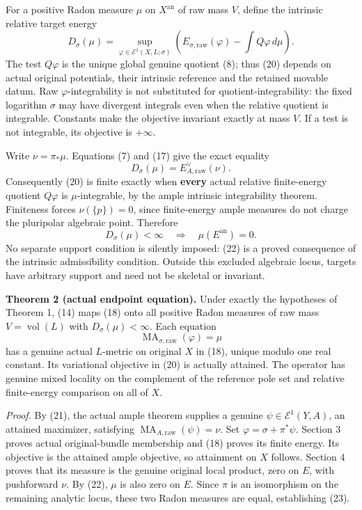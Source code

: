 \documentclass[
  10pt,
]{article}
\begin{document}
For a positive Radon measure \(\mu\) on \(X^{\mathrm{an}}\) of raw mass
\(V\), define the intrinsic relative target energy \[
 D_\sigma(\mu)=
 \sup_{\varphi\in\mathcal E^1(X,L;\sigma)}
       \left(E_{\sigma,\mathrm{raw}}(\varphi)-\int Q\varphi\,d\mu\right).
 \tag{20}
\] The test \(Q\varphi\) is the unique global genuine quotient (8); thus
(20) depends on actual original potentials, their intrinsic reference
and the retained movable datum. Raw \(\varphi\)-integrability is not
substituted for quotient-integrability: the fixed logarithm \(\sigma\)
may have divergent integrals even when the relative quotient is
integrable. Constants make the objective invariant exactly at mass
\(V\). If a test is not integrable, its objective is \(+\infty\).

Write \(\nu=\pi_*\mu\). Equations (7) and (17) give the exact equality
\[ D_\sigma(\mu)=E_{A,\mathrm{raw}}^\vee(\nu). \tag{21} \] Consequently
(20) is finite exactly when \textbf{every} actual relative finite-energy
quotient \(Q\varphi\) is \(\mu\)-integrable, by the ample intrinsic
integrability theorem. Finiteness forces \(\nu(\{p\})=0\), since
finite-energy ample measures do not charge the pluripolar algebraic
point. Therefore
\[ D_\sigma(\mu)<\infty\quad\Longrightarrow\quad\mu(E^{\mathrm{an}})=0. \tag{22} \]
No separate support condition is silently imposed: (22) is a proved
consequence of the intrinsic admissibility condition. Outside this
excluded algebraic locus, targets have arbitrary support and need not be
skeletal or invariant.

\textbf{Theorem 2 (actual endpoint equation).} Under exactly the
hypotheses of Theorem 1, (14) maps (18) onto all positive Radon measures
of raw mass \(V=\operatorname{vol}(L)\) with \(D_\sigma(\mu)<\infty\).
Each equation
\[ \operatorname{MA}_{\sigma,\mathrm{raw}}(\varphi)=\mu \tag{23} \] has
a genuine actual \(L\)-metric on original \(X\) in (18), unique modulo
one real constant. Its variational objective in (20) is actually
attained. The operator has genuine mixed locality on the complement of
the reference pole set and relative finite-energy comparison on all of
\(X\).

\emph{Proof.} By (21), the actual ample theorem supplies a genuine
\(\psi\in\mathcal E^1(Y,A)\), an attained maximizer, satisfying
\(\operatorname{MA}_{A,\mathrm{raw}}(\psi)=\nu\). Set
\(\varphi=\sigma+\pi^*\psi\). Section 3 proves actual original-bundle
membership and (18) proves its finite energy. Its objective is the
attained ample objective, so attainment on \(X\) follows. Section 4
proves that its measure is the genuine original local product, zero on
\(E\), with pushforward \(\nu\). By (22), \(\mu\) is also zero on \(E\).
Since \(\pi\) is an isomorphism on the remaining analytic locus, these
two Radon measures are equal, establishing (23).
\end{document}
